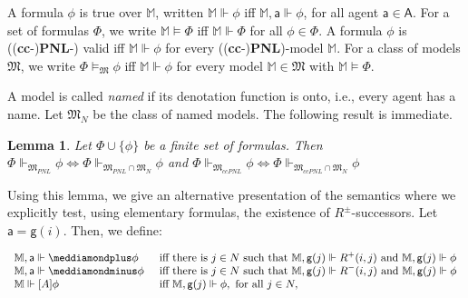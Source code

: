 \documentclass{easychair}
\newcommand{\A}{\mathsf{A}}
\newcommand{\g}{\mathsf{g}}
\newcommand{\ag}{\mathsf{a}}
\newtheorem{lemma}{Lemma}
\newcommand{\dplus}{\meddiamondplus}
\newcommand{\dminus}{\meddiamondminus}
\newcommand{\ccpnlmodels}{\mathfrak{M}_{\textit{ccPNL}}}
\newcommand{\pnlmodels}{\mathfrak{M}_{\textit{PNL}}}
\newcommand{\namedmodels}{\mathfrak{M}_{\textit{N}}}
\newcommand{\PNL}{\textbf{PNL}}
\newcommand{\cc}{\textbf{cc}}
\begin{document}
A formula $\phi$ is true over $\mathbb{M}$, written $\mathbb{M}\Vdash \phi$ iff
$\mathbb{M},\ag\Vdash \phi$, for all agent $\ag\in\A$. For a set of formulas
$\Phi$, we write $\mathbb{M}\models \Phi$ iff $\mathbb{M}\Vdash \Phi$ for all $\phi
\in \Phi$. A formula $\phi$ is ((\cc-)\PNL-) valid iff $\mathbb{M}\Vdash\phi$ for every
((\cc-)\PNL)-model $\mathbb{M}$. For a class of models $\mathfrak{M}$, we write
$\Phi\models_{\mathfrak{M}} \phi$ iff $\mathbb{M}\Vdash \phi$ for every model
$\mathbb{M}\in \mathfrak{M}$ with $\mathbb{M}\models \Phi$. 


\begin{comment}
We define the following formulas
\begin{align*}
    \mu &= \forall i,j.(\neg R^+(i,j)\vee\neg R^-(i,j))\\
    \sigma^+ &= \forall i,j.(R^+(i,j)\rightarrow R^+(j,i))\\
    \sigma^- &= \forall i,j.(R^-(i,j)\rightarrow R^-(j,i))\\
    \rho^+ &= \forall i.R^+(i,i)
\end{align*}

\begin{lemma}
For every set of formulas $T\cup \{\phi\}$, we have
$$T\models_{\mathfrak{PNL}}\phi \iff T,\mu,\sigma^+,\sigma^-,\rho^+\models \phi.$$
\end{lemma}
\end{comment}

A model is called \emph{named} if its denotation function is onto, i.e., every
agent has a name. Let $\namedmodels$ be the class of named models. The following result is immediate. 

\begin{lemma}
Let $\Phi\cup\{\phi\}$ be a finite set of formulas. Then
$\Phi\Vdash_{\pnlmodels}\phi \iff \Phi\Vdash_{\pnlmodels\cap \namedmodels}\phi$ and $\Phi\Vdash_{\ccpnlmodels}\phi \iff \Phi\Vdash_{\ccpnlmodels\cap \namedmodels}\phi$
\end{lemma}

Using this lemma, we give an alternative presentation of the semantics 
where we explicitly test, using elementary formulas,  the existence of 
$R^{\pm}$-successors.
Let $\ag=\g(i)$. Then, we define: 

\noindent$
\small\begin{array}{lll}
    \mathbb{M},\ag \Vdash \dplus\phi &\text{ iff there is } j\in N \text{ such that } \mathbb{M},\g(j)\Vdash R^+(i,j) \text{ and }  \mathbb{M},\g(j)\Vdash \phi\\
    \mathbb{M},\ag \Vdash \dminus\phi &\text{ iff there is } j\in N \text{ such that } \mathbb{M},\g(j)\Vdash R^-(i,j)\text{ and }  \mathbb{M},\g(j)\Vdash \phi \\
    \mathbb{M}\Vdash [A]\phi &\text{ iff } \mathbb{M},\g(j)\Vdash \phi, \text{ for all } j\in N, 
\end{array}
$
\end{document}
